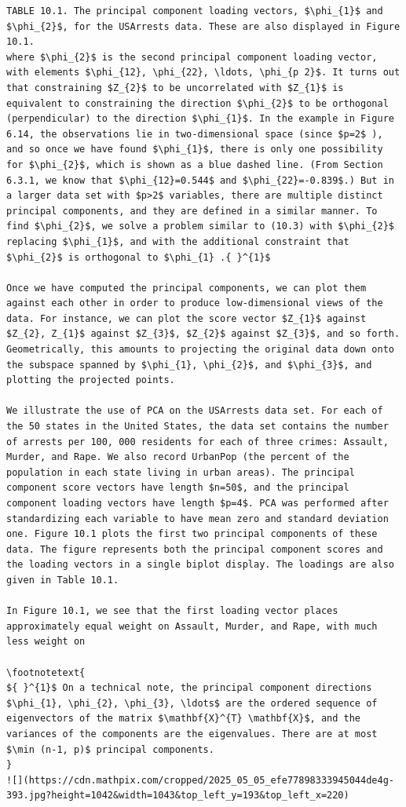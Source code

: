 \documentclass[10pt]{article}
\let\svthefootnote\thefootnote
\newcommand\blfootnotetext[1]{%
  \let\thefootnote\relax\footnote{#1}%
  \addtocounter{footnote}{-1}%
  \let\thefootnote\svthefootnote%
}
\let\svfootnotetext\footnotetext
\renewcommand\footnotetext[2][?]{%
  \if\relax#1\relax%
    \ifnum\value{footnote}=0\blfootnotetext{#2}\else\svfootnotetext{#2}\fi%
  \else%
    \if?#1\ifnum\value{footnote}=0\blfootnotetext{#2}\else\svfootnotetext{#2}\fi%
    \else\svfootnotetext[#1]{#2}\fi%
  \fi
}
\begin{document}
\begin{verbatim}
TABLE 10.1. The principal component loading vectors, $\phi_{1}$ and $\phi_{2}$, for the USArrests data. These are also displayed in Figure 10.1.
where $\phi_{2}$ is the second principal component loading vector, with elements $\phi_{12}, \phi_{22}, \ldots, \phi_{p 2}$. It turns out that constraining $Z_{2}$ to be uncorrelated with $Z_{1}$ is equivalent to constraining the direction $\phi_{2}$ to be orthogonal (perpendicular) to the direction $\phi_{1}$. In the example in Figure 6.14, the observations lie in two-dimensional space (since $p=2$ ), and so once we have found $\phi_{1}$, there is only one possibility for $\phi_{2}$, which is shown as a blue dashed line. (From Section 6.3.1, we know that $\phi_{12}=0.544$ and $\phi_{22}=-0.839$.) But in a larger data set with $p>2$ variables, there are multiple distinct principal components, and they are defined in a similar manner. To find $\phi_{2}$, we solve a problem similar to (10.3) with $\phi_{2}$ replacing $\phi_{1}$, and with the additional constraint that $\phi_{2}$ is orthogonal to $\phi_{1} .{ }^{1}$

Once we have computed the principal components, we can plot them against each other in order to produce low-dimensional views of the data. For instance, we can plot the score vector $Z_{1}$ against $Z_{2}, Z_{1}$ against $Z_{3}$, $Z_{2}$ against $Z_{3}$, and so forth. Geometrically, this amounts to projecting the original data down onto the subspace spanned by $\phi_{1}, \phi_{2}$, and $\phi_{3}$, and plotting the projected points.

We illustrate the use of PCA on the USArrests data set. For each of the 50 states in the United States, the data set contains the number of arrests per 100, 000 residents for each of three crimes: Assault, Murder, and Rape. We also record UrbanPop (the percent of the population in each state living in urban areas). The principal component score vectors have length $n=50$, and the principal component loading vectors have length $p=4$. PCA was performed after standardizing each variable to have mean zero and standard deviation one. Figure 10.1 plots the first two principal components of these data. The figure represents both the principal component scores and the loading vectors in a single biplot display. The loadings are also given in Table 10.1.

In Figure 10.1, we see that the first loading vector places approximately equal weight on Assault, Murder, and Rape, with much less weight on

\footnotetext{
${ }^{1}$ On a technical note, the principal component directions $\phi_{1}, \phi_{2}, \phi_{3}, \ldots$ are the ordered sequence of eigenvectors of the matrix $\mathbf{X}^{T} \mathbf{X}$, and the variances of the components are the eigenvalues. There are at most $\min (n-1, p)$ principal components.
}
![](https://cdn.mathpix.com/cropped/2025_05_05_efe77898333945044de4g-393.jpg?height=1042&width=1043&top_left_y=193&top_left_x=220)


\end{verbatim}
\end{document}
